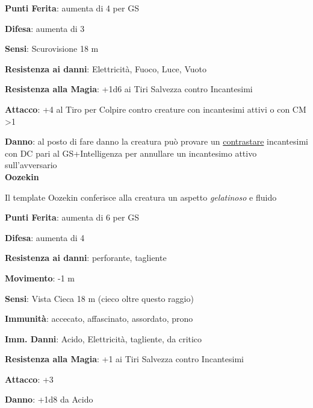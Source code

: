 \begin{multicols}{2}
\textbf{Punti Ferita}: aumenta di 4 per GS

\textbf{Difesa}: aumenta di 3

\textbf{Sensi}: Scurovisione 18 m

\textbf{Resistenza ai danni}:  Elettricità, Fuoco, Luce, Vuoto

\textbf{Resistenza alla Magia}: +1d6 ai Tiri Salvezza contro Incantesimi

\textbf{Attacco}: +4 al Tiro per Colpire contro creature con incantesimi attivi o con CM >1

\textbf{Danno}: al posto di fare danno la creatura può provare un \hyperlink{contrastareincantesimi}{contrastare} incantesimi con DC pari al GS+Intelligenza per annullare un incantesimo attivo sull'avversario\\

\textbf{Oozekin}

Il template Oozekin conferisce alla creatura un aspetto \emph{gelatinoso} e fluido

\textbf{Punti Ferita}: aumenta di 6 per GS

\textbf{Difesa}: aumenta di 4

\textbf{Resistenza ai danni}:  perforante, tagliente

\textbf{Movimento}: -1 m

\textbf{Sensi}: Vista Cieca 18 m (cieco oltre questo raggio)

\textbf{Immunità}: accecato, affascinato, assordato, prono

\textbf{Imm. Danni}: Acido, Elettricità, tagliente, da critico

\textbf{Resistenza alla Magia}: +1 ai Tiri Salvezza contro Incantesimi

\textbf{Attacco}: +3

\textbf{Danno}: +1d8 da Acido

\end{multicols}



%

